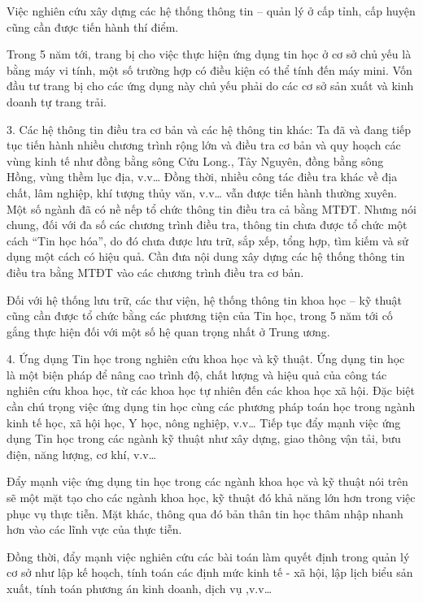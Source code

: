 \documentclass[11pt, a4paper, reqno, oneside]{book}
\begin{document}
Việc nghiên cứu xây dựng các hệ thống thông tin – quản lý ở cấp tỉnh, cấp huyện cũng cần được tiến hành thí điểm.


 Trong 5 năm tới, trang bị cho việc thực hiện ứng dụng tin học ở cơ sở chủ yếu là bằng máy vi tính, một số trường hợp có điều kiện có thể tính đến máy mini. Vốn đầu tư trang bị cho các ứng dụng này chủ yếu phải do các cơ sở sản xuất và kinh doanh tự trang trải.
 
 
3.	Các hệ thông tin điều tra cơ bản và các hệ thông tin khác: Ta đã và đang tiếp tục tiến hành nhiều chương trình rộng lớn và điều tra cơ bản và quy hoạch các vùng kinh tế như đồng bằng sông Cửu Long., Tây Nguyên, đồng bằng sông Hồng, vùng thềm lục địa, v.v… Đồng thời, nhiều công tác điều tra khác về địa chất, lâm nghiệp, khí tượng thủy văn, v.v… vẫn được tiến hành thường xuyên. Một số ngành đã có nề nếp tổ chức thông tin điều tra cả bằng MTĐT. Nhưng nói chung, đối với đa số các chương trình điều tra, thông tin chưa được tổ chức một cách “Tin học hóa”, do đó chưa được lưu trữ, sắp xếp, tổng hợp, tìm kiếm và sử dụng một cách có hiệu quả. Cần đưa nội dung xây dựng các hệ thống thông tin điều tra bằng MTĐT vào các chương trình điều tra cơ bản.


Đối với hệ thống lưu trữ, các thư viện, hệ thống thông tin khoa học – kỹ thuật cũng cần được tổ chức bằng các phương tiện của Tin học, trong 5 năm tới cố gắng thực hiện đối với một số hệ quan trọng nhất ở Trung ương.


4.	Ứng dụng Tin học trong nghiên cứu khoa học và kỹ thuật. Ứng dụng tin học là một biện pháp để nâng cao trình độ, chất lượng và hiệu quả của công tác nghiên cứu khoa học, từ các khoa học tự nhiên đến các khoa học xã hội. Đặc biệt cần chú trọng việc ứng dụng tin học cùng các phương pháp toán học trong ngành kinh tế học, xã hội học, Y học, nông nghiệp, v.v… Tiếp tục đẩy mạnh việc ứng dụng Tin học trong các ngành kỹ thuật như xây dựng, giao thông vận tải, bưu điện, năng lượng, cơ khí, v.v…


Đẩy mạnh việc ứng dụng tin học trong các ngành khoa học và kỹ thuật nói trên sẽ một mặt tạo cho các ngành khoa học, kỹ thuật đó khả năng lớn hơn trong việc phục vụ thực tiễn. Mặt khác, thông qua đó bản thân tin học thâm nhập nhanh hơn vào các lĩnh vực của thực tiễn.


 Đồng thời, đẩy mạnh việc nghiên cứu các bài toán làm quyết định trong quản lý cơ sở như lập kế hoạch, tính toán các định mức kinh tế - xã hội, lập lịch biểu sản xuất, tính toán phương án kinh doanh, dịch vụ ,v.v…
\end{document}
